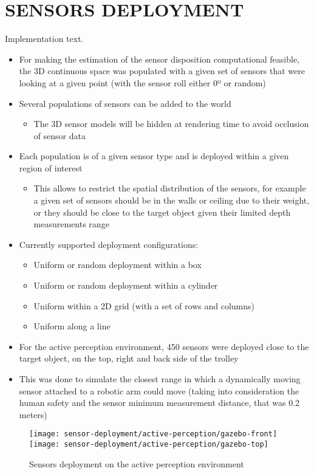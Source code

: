 \section{\uppercase{Sensors deployment}}\label{sec:sensors-deployment}

\noindent Implementation text.

\begin{itemize}
	\item For making the estimation of the sensor disposition computational feasible, the 3D continuous space was populated with a given set of sensors that were looking at a given point (with the sensor roll either 0º or random)
	\item Several populations of sensors can be added to the world
	\begin{itemize}
		\item The 3D sensor models will be hidden at rendering time to avoid occlusion of sensor data
	\end{itemize}
	\item Each population is of a given sensor type and is deployed within a given region of interest 
	\begin{itemize}
		\item This allows to restrict the spatial distribution of the sensors, for example a given set of sensors should be in the walls or ceiling due to their weight, or they should be close to the target object given their limited depth measurements range
	\end{itemize}
	\item Currently supported deployment configurations:
	\begin{itemize}
		\item Uniform or random deployment within a box
		\item Uniform or random deployment within a cylinder
		\item Uniform within a 2D grid (with a set of rows and columns)
		\item Uniform along a line
	\end{itemize}
\end{itemize}

\begin{itemize}
	\item For the active perception environment, 450 sensors were deployed close to the target object, on the top, right and back side of the trolley
	\item This was done to simulate the closest range in which a dynamically moving sensor attached to a robotic arm could move (taking into consideration the human safety and the sensor minimum measurement distance, that was 0.2 meters)
\end{itemize}
\begin{figure}
	\centering
	\texttt{[image: sensor-deployment/active-perception/gazebo-front]}\hspace{1em}
	\texttt{[image: sensor-deployment/active-perception/gazebo-top]}
	\caption{Sensors deployment on the active perception environment}
\end{figure}


